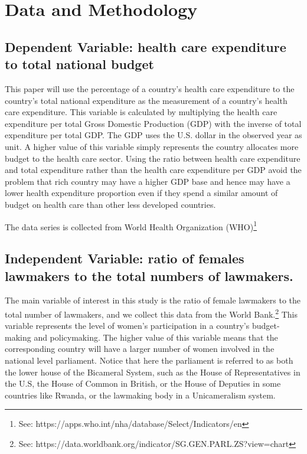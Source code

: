 \section{Data and Methodology}
\label{Data and method}

\subsection{Dependent Variable: health care expenditure to total national budget}
This paper will use the percentage of a country's health care expenditure to the country's total national expenditure as the measurement of a country's health care expenditure.
This variable is calculated by multiplying the health care expenditure per total Gross Domestic Production (GDP) with the inverse of total expenditure per total GDP.
The GDP uses the U.S. dollar in the observed year as unit.
A higher value of this variable simply represents the country allocates more budget to the health care sector. 
Using the ratio between health care expenditure and total expenditure rather than the health care expenditure per GDP avoid the problem that rich country may have a higher GDP base and hence may have a lower health expenditure proportion even if they spend a similar amount of budget on health care than other less developed countries. 


The data series is collected from World Health Organization (WHO)\footnote{See: https://apps.who.int/nha/database/Select/Indicators/en}

\subsection{Independent Variable: ratio of females lawmakers to the total numbers of lawmakers.}
The main variable of interest in this study is the ratio of female lawmakers to the total number of lawmakers, and we collect this data from the World Bank.\footnote{See: https://data.worldbank.org/indicator/SG.GEN.PARL.ZS?view=chart}
This variable represents the level of women's participation in a country's budget-making and policymaking.
The higher value of this variable means that the corresponding country will have a larger number of women involved in the national level parliament.
Notice that here the parliament is referred to as both the lower house of the Bicameral System, such as the House of Representatives in the U.S, the House of Common in British, or the House of Deputies in some countries like Rwanda, or the lawmaking body in a Unicameralism system. 

